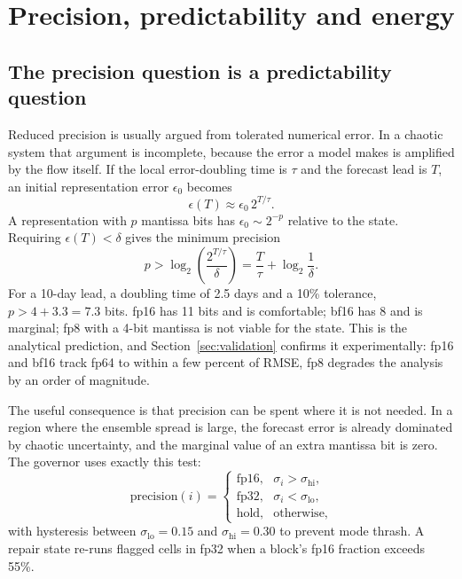 \FloatBarrier
\section{Precision, predictability and energy}\label{sec:precision}\label{sec:energy}

\subsection{The precision question is a predictability question}
Reduced precision is usually argued from tolerated numerical error. In a chaotic system that
argument is incomplete, because the error a model makes is amplified by the flow itself. If the
local error-doubling time is $\tau$ and the forecast lead is $T$, an initial representation error
$\epsilon_0$ becomes
\begin{equation}
\epsilon(T) \approx \epsilon_0\,2^{T/\tau}.
\end{equation}
A representation with $p$ mantissa bits has $\epsilon_0 \sim 2^{-p}$ relative to the state.
Requiring $\epsilon(T) < \delta$ gives the minimum precision
\begin{equation}
p > \log_2\!\left(\frac{2^{T/\tau}}{\delta}\right) = \frac{T}{\tau} + \log_2\frac{1}{\delta}.
\label{eq:pmin}
\end{equation}
For a 10-day lead, a doubling time of 2.5 days and a 10\% tolerance, $p > 4 + 3.3 = 7.3$ bits.
fp16 has 11 bits and is comfortable; bf16 has 8 and is marginal; fp8 with a 4-bit mantissa is
not viable for the state. This is the analytical prediction, and Section~\ref{sec:validation}
confirms it experimentally: fp16 and bf16 track fp64 to within a few percent of RMSE, fp8
degrades the analysis by an order of magnitude.

The useful consequence is that precision can be spent where it is not needed. In a region where
the ensemble spread is large, the forecast error is already dominated by chaotic uncertainty, and
the marginal value of an extra mantissa bit is zero. The governor uses exactly this test:
\begin{equation}
\text{precision}(i) =
\begin{cases}
\text{fp16}, & \sigma_i > \sigma_{\mathrm{hi}},\\
\text{fp32}, & \sigma_i < \sigma_{\mathrm{lo}},\\
\text{hold}, & \text{otherwise},
\end{cases}
\end{equation}
with hysteresis between $\sigma_{\mathrm{lo}}=0.15$ and $\sigma_{\mathrm{hi}}=0.30$ to prevent
mode thrash. A repair state re-runs flagged cells in fp32 when a block's fp16 fraction exceeds
55\%.

